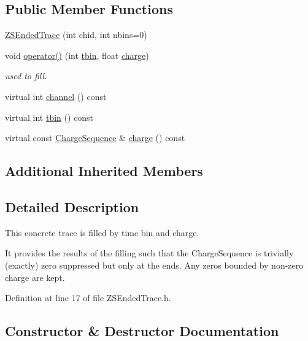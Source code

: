\subsection*{Public Member Functions}
\begin{DoxyCompactItemize}
\item 
\hyperlink{class_wire_cell_1_1_z_s_ended_trace_a08a65ba205647c8e2d6305c075f08d3c}{Z\+S\+Ended\+Trace} (int chid, int nbins=0)
\item 
void \hyperlink{class_wire_cell_1_1_z_s_ended_trace_ae621cf5fc681fb31197731b313c5093e}{operator()} (int \hyperlink{class_wire_cell_1_1_z_s_ended_trace_ac0ae929485ed907726568f02193e931f}{tbin}, float \hyperlink{class_wire_cell_1_1_z_s_ended_trace_ab2434cf1397e2bc111fd44ffd0afe75e}{charge})
\begin{DoxyCompactList}\small\item\em used to fill. \end{DoxyCompactList}\item 
virtual int \hyperlink{class_wire_cell_1_1_z_s_ended_trace_ac873750a7a0d47c320050561e8608a0a}{channel} () const
\item 
virtual int \hyperlink{class_wire_cell_1_1_z_s_ended_trace_ac0ae929485ed907726568f02193e931f}{tbin} () const
\item 
virtual const \hyperlink{class_wire_cell_1_1_i_trace_a3dab103257bc46bfd486966f69836954}{Charge\+Sequence} \& \hyperlink{class_wire_cell_1_1_z_s_ended_trace_ab2434cf1397e2bc111fd44ffd0afe75e}{charge} () const
\end{DoxyCompactItemize}
\subsection*{Additional Inherited Members}


\subsection{Detailed Description}
This concrete trace is filled by time bin and charge.

It provides the results of the filling such that the Charge\+Sequence is trivially (exactly) zero suppressed but only at the ends. Any zeros bounded by non-\/zero charge are kept. 

Definition at line 17 of file Z\+S\+Ended\+Trace.\+h.



\subsection{Constructor \& Destructor Documentation}
\mbox{\label{class_wire_cell_1_1_z_s_ended_trace_a08a65ba205647c8e2d6305c075f08d3c}} 
